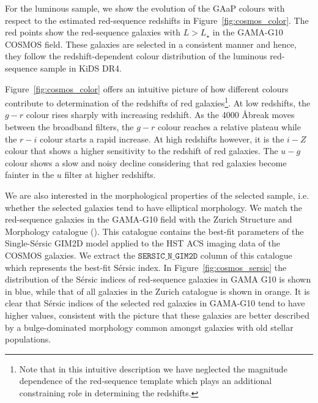 \documentclass{aa}
\numberwithin{equation}{section}
\begin{document}
For the luminous sample, we show the evolution of the GAaP colours with respect to the estimated red-sequence redshifts in Figure~\ref{fig:cosmos_color}. The red points show the red-sequence galaxies with $L>L_{\star}$ in the GAMA-G10 COSMOS field. These galaxies are selected in a consistent manner and hence, they follow the redshift-dependent colour distribution of the luminous red-sequence sample in KiDS DR4. 

Figure~\ref{fig:cosmos_color} offers an intuitive picture of how different colours contribute to determination of the redshifts of red galaxies\footnote{Note that in this intuitive description we have neglected the magnitude dependence of the red-sequence template which plays an additional constraining role in determining the redshifts.}. At low redshifts, the $g-r$ colour rises sharply with increasing redshift. As the 4000 \AA break moves between the broadband filters, the $g-r$ colour reaches a relative plateau while the $r-i$ colour starts a rapid increase. At high redshifts however, it is the $i-Z$ colour that shows a higher sensitivity to the redshift of red galaxies. The $u-g$ colour shows a slow and noisy decline considering that red galaxies become fainter in the $u$ filter at higher redshifts. 




We are also interested in the morphological properties of the selected sample, i.e. whether the selected galaxies tend to have elliptical morphology. We match the red-sequence galaxies in the GAMA-G10 field with the Zurich Structure and Morphology catalogue (\citealt{scarlata2007, sargent2007}). This catalogue contains the best-fit parameters of the Single-S\'{e}rsic GIM2D model applied to the HST ACS imaging data of the COSMOS galaxies. We extract the $\mathtt{SERSIC\_N\_GIM2D}$ column of this catalogue which represents the best-fit S\'{e}rsic index. In Figure~\ref{fig:cosmos_sersic} the distribution of the S\'{e}rsic indices of red-sequence galaxies in GAMA G10 is shown in blue, while that of all galaxies in the Zurich catalogue is shown in orange. It is clear that S\'{e}rsic indices of the selected red galaxies in GAMA-G10 tend to have higher values, consistent with the picture that these galaxies are better described by a bulge-dominated morphology common amongst galaxies with old stellar populations.
\end{document}
